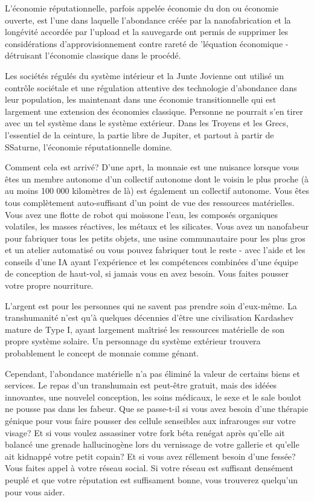 L'économie réputationnelle, parfois appelée économie du don ou économie ouverte, est l'une dans laquelle l'abondance créée par la nanofabrication et la longévité accordée par l'upload et la sauvegarde ont permis de supprimer les considérations d'approvisionnement contre rareté de 'léquation économique - détruisant l'économie classique dans le procédé. 

Les sociétés régulés du système intérieur et la Junte Jovienne ont utilisé un contrôle sociétale et une régulation attentive des technologie d'abondance dans leur population, les maintenant dans une économie transitionnelle qui est largement une extension des économies classique. Personne ne pourrait s'en tirer avec un tel système dans le système extérieur. Dans les Troyens et les Grecs, l'essentiel de la ceinture, la partie libre de Jupiter, et partout à partir de SSaturne, l'économie réputationnelle domine. 

Comment cela est arrivé? D'une aprt, la monnaie est une nuisance lorsque vous êtes un membre autonome d'un collectif autonome dont le voisin le plus proche (à au moins 100 000 kilomètres de là) est également un collectif autonome. Vous êtes tous complètement auto-suffisant d'un point de vue des ressources matérielles. Vous avez une flotte de robot qui moissone l'eau, les composés organiques volatiles, les masses réactives, les métaux et les silicates. Vous avez un nanofabeur pour fabriquer tous les petits objets, une usine communautaire pour les plus gros et un atelier automatisé ou vous pouvez fabriquer tout le reste - avec l'aide et les conseils d'une IA ayant l'expérience et les compétences combinées d'une équipe de conception de haut-vol, si jamais vous en avez besoin. Vous faites pousser votre propre nourriture. 

L'argent est pour les personnes qui ne savent pas prendre soin d'eux-même. La transhumanité n'est qu'à quelques décennies d'être une civilisation Kardashev mature de Type I, ayant largement maîtrisé les ressources matérielle de son propre système solaire. Un personnage du système extérieur trouvera probablement le concept de monnaie comme génant. 

Cependant, l'abondance matérielle n'a pas éliminé la valeur de certains biens et services. Le repas d'un transhumain est peut-être gratuit, mais des idéées innovantes, une nouvelel conception, les soins médicaux, le sexe et le sale boulot ne pousse pas dans les fabeur. Que se passe-t-il si vous avez besoin d'une thérapie génique pour vous faire pousser des cellule senseibles aux infrarouges sur votre visage? Et si vous voulez assassiner votre fork béta renégat après qu'elle ait balancé une grenade hallucinogène lors du vernissage de votre gallerie et qu'elle ait kidnappé votre petit copain? Et si vous avez réllement besoin d'une fessée? Vous faites appel à votre réseau social. Si votre réseau est suffisant densément peuplé et que votre réputation est suffisament bonne, vous trouverez quelqu'un pour vous aider. 

